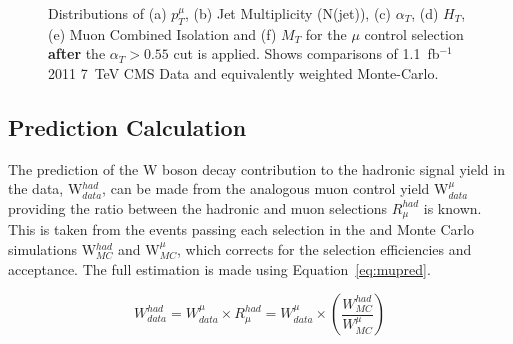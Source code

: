 \begin{figure}[htbp]
\begin{center}
\begin{minipage}[b]{1.\linewidth}
\end{minipage}
\caption{\label{fig:muonplots_afterat} Distributions of (a) $p_{T}^{\mu}$, (b) Jet Multiplicity (N(jet)), (c) $\alpha_{T}$, (d) $H_{T}$, (e) Muon Combined Isolation and (f) $M_{T}$ for the $\mu$ control selection \textbf{after} the $\alpha_{T} > 0.55$ cut is applied. Shows comparisons of 1.1~fb$^{-1}$ 2011 7~TeV CMS Data and equivalently weighted Monte-Carlo.}
\label{fig:kinafter}
\end{center}
\end{figure}
\subsection{Prediction Calculation}

The prediction of the W boson decay contribution to the hadronic signal yield in the data, W$^{had}_{data}$, can be made from the analogous muon control yield W$^{\mu}_{data}$ providing the ratio between the hadronic and muon selections $R^{had}_{\mu}$ is known. This is taken from the events passing each selection in the \ttj and \wj Monte Carlo simulations W$^{had}_{MC}$ and W$^{\mu}_{MC}$, which corrects for the selection efficiencies and acceptance. The full estimation is made using Equation~\ref{eq:mupred}.

\begin{equation}
W^{had}_{data} = W^{\mu}_{data}\times R^{had}_{\mu} = W^{\mu}_{data}\times (\frac{W^{had}_{MC}}{W^{\mu}_{MC}})
\label{eq:mupred}
\end{equation}

